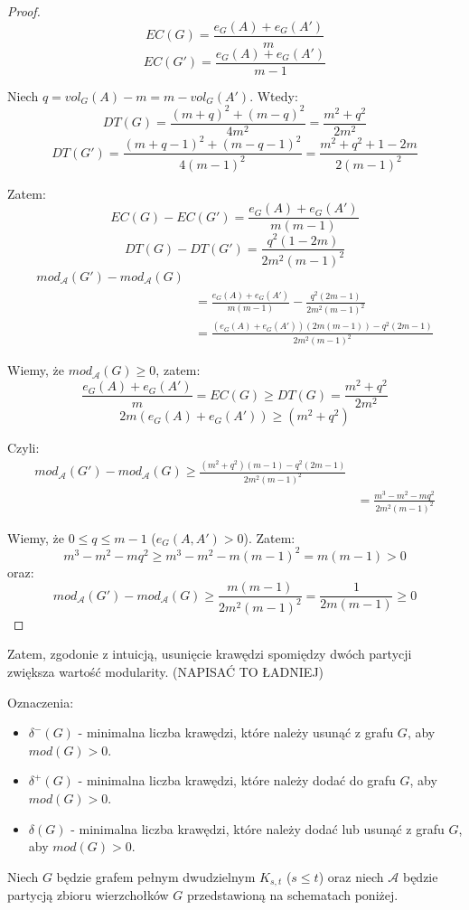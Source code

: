 \documentclass[letterpaper,12pt]{article}
\begin{document}
    \begin{proof}
      \[EC(G) = \frac{e_G(A)+e_G(A')}{m}\]
      \[EC(G') = \frac{e_G(A)+e_G(A')}{m-1}\]

      Niech \(q = vol_G(A)-m = m-vol_G(A')\). Wtedy:
      \[DT(G) = \frac{(m+q)^2 + (m-q)^2}{4m^2} = \frac{m^2+q^2}{2m^2}\]
      \[DT(G') = \frac{(m+q-1)^2 + (m-q-1)^2}{4(m-1)^2} = \frac{m^2+q^2+1-2m}{2(m-1)^2}\]

      Zatem:
      \[EC(G)-EC(G') = \frac{e_G(A)+e_G(A')}{m(m-1)}\]
      \[DT(G)-DT(G') = \frac{q^2(1-2m)}{2m^2(m-1)^2}\]
      \begin{align*}
        mod_{\mathcal{A}}(G') - mod_{\mathcal{A}}(G)\\
        &= \frac{e_G(A)+e_G(A')}{m(m-1)} - \frac{q^2(2m-1)}{2m^2(m-1)^2}\\
        &= \frac{(e_G(A)+e_G(A'))(2m(m-1)) - q^2(2m-1)}{2m^2(m-1)^2}
      \end{align*}

      Wiemy, że \(mod_{\mathcal{A}}(G) \geq 0\), zatem:
      \[\frac{e_G(A)+e_G(A')}{m} = EC(G) \geq DT(G) = \frac{m^2+q^2}{2m^2}\]
      \[2m(e_G(A)+e_G(A')) \geq (m^2+q^2)\]
      
      Czyli:
      \begin{align*}
        mod_{\mathcal{A}}(G') - mod_{\mathcal{A}}(G) \geq \frac{(m^2+q^2)(m-1)- q^2(2m-1)}{2m^2(m-1)^2}\\
        &= \frac{m^3-m^2-mq^2}{2m^2(m-1)^2}
      \end{align*}

      Wiemy, że \(0 \leq q \leq m-1\) (\(e_G(A, A') > 0\)). Zatem:
      \[m^3-m^2-mq^2 \geq m^3-m^2-m(m-1)^2 = m(m-1) > 0\]
      oraz:
      \[mod_{\mathcal{A}}(G') - mod_{\mathcal{A}}(G) \geq \frac{m(m-1)}{2m^2(m-1)^2} = \frac{1}{2m(m-1)} \geq 0\]
    \end{proof}
    Zatem, zgodonie z intuicją, usunięcie krawędzi spomiędzy dwóch partycji zwiększa wartość modularity. (NAPISAĆ TO ŁADNIEJ)

    Oznaczenia:
    \begin{itemize}
      \item \(\delta^{-}(G)\) - minimalna liczba krawędzi, które należy usunąć z grafu \(G\), aby \(mod(G) > 0\).
      \item \(\delta^{+}(G)\) - minimalna liczba krawędzi, które należy dodać do grafu \(G\), aby \(mod(G) > 0\).
      \item \(\delta(G)\) - minimalna liczba krawędzi, które należy dodać lub usunąć z grafu \(G\), aby \(mod(G) > 0\).
    \end{itemize}
    Niech \(G\) będzie grafem pełnym dwudzielnym \(K_{s,t}\) (\(s \leq t\)) oraz niech \(\mathcal{A}\) będzie partycją zbioru wierzchołków \(G\) przedstawioną na schematach poniżej.\\
\end{document}
